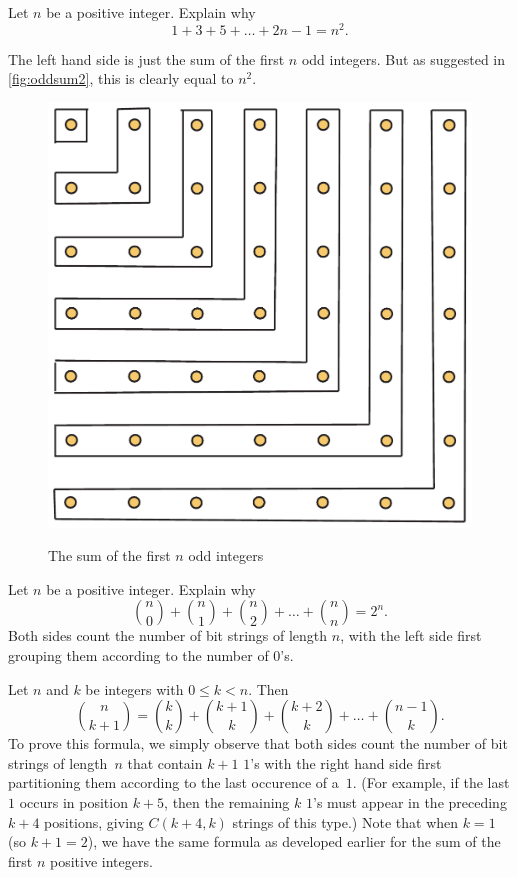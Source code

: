 \begin{example}
Let $n$ be a positive integer. Explain why
\[
1+3+5+\dots+2n-1=n^2.
\]

The left hand side is just the
sum of the first $n$ odd integers.  But as suggested in
\autoref{fig:oddsum2}, this is clearly equal to $n^2$.

\begin{figure}
\begin{center}
\includegraphics[scale=.3]{string-figs/3012-fig21}\\
\caption{The sum of the first $n$ odd integers
\label{fig:oddsum2}}
\end{center}
\end{figure}

\end{example}

\begin{example}
Let $n$ be a positive integer.  Explain why
\[
\binom{n}{0}+\binom{n}{1}+\binom{n}{2}+\dots+\binom{n}{n}=2^n.
\]
Both sides count the number of bit strings of length $n$, with
the left side first grouping them according to the number of
$0$'s.
\end{example}

\begin{example}
Let $n$ and $k$ be integers with $0\le k<n$.
Then
\[
\binom{n}{k+1} = \binom{k}{k} + \binom{k+1}{k} +
\binom{k+2}{k} +\dots+
\binom{n-1}{k}.
\]
To prove this formula, we simply observe that both sides count the
number of bit strings of length~$n$ that contain $k+1$ $1$'s with the
right hand side first partitioning them according to the last
occurence of a~$1$. (For example, if the last $1$ occurs in position
$k+5$, then the remaining $k$ $1$'s must appear in the preceding $k+4$
positions, giving $C(k+4,k)$ strings of this type.)  Note that
when $k=1$ (so $k+1=2$), we have the same formula as developed earlier for the
sum of the first $n$ positive integers.
\end{example}

